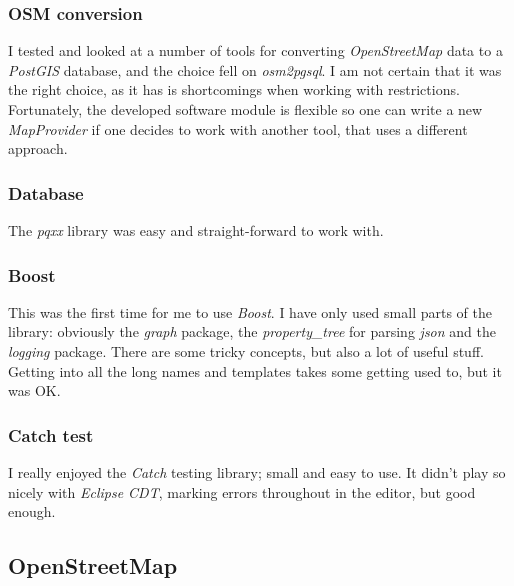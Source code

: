 \documentclass[../main.tex]{subfiles}
\begin{document}
\subsubsection{OSM conversion}
I tested and looked at a number of tools for converting \textit{OpenStreetMap} data to a \textit{PostGIS} database, and the choice fell on \textit{osm2pgsql}. I am not certain that it was the right choice, as it has is shortcomings when working with restrictions. Fortunately, the developed software module is flexible so one can write a new \textit{MapProvider} if one decides to work with another tool, that uses a different approach. 

\subsubsection{Database}
The \textit{pqxx} library was easy and straight-forward to work with.

\subsubsection{Boost}
This was the first time for me to use \textit{Boost}. I have only used small parts of the library: obviously the \textit{graph} package, the \textit{property\_tree} for parsing \textit{json} and the \textit{logging} package. There are some tricky concepts, but also a lot of useful stuff. Getting into all the long names and templates takes some getting used to, but it was OK.

\subsubsection{Catch test}
I really enjoyed the \textit{Catch} testing library; small and easy to use. It didn't play so nicely with \textit{Eclipse CDT}, marking errors throughout in the editor, but good enough.

\subsection{OpenStreetMap}

\end{document}
